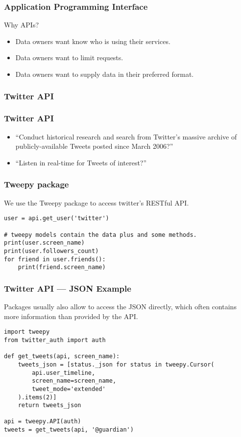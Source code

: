 
\begin{frame}
    \frametitle{Application Programming Interface}

    Why APIs?

    \begin{itemize}
        \item Data owners want know who is using their services.
        \item Data owners want to limit requests.
        \item Data owners want to supply data in their preferred format.
    \end{itemize}
\end{frame}

\subsubsection*{Twitter API}
\label{sec:twitter-api}

\begin{frame}
    \frametitle{Twitter API}
    \begin{itemize}
        \item ``Conduct historical research and search from Twitter's
        massive archive of publicly-available Tweets posted since
        March 2006?''
        \item ``Listen in real-time for Tweets of interest?''
    \end{itemize}
\end{frame}

\begin{frame}[fragile]
    \frametitle{Tweepy package}

    We use the Tweepy package to access twitter's RESTful API.

\begin{verbatim}
user = api.get_user('twitter')

# tweepy models contain the data plus and some methods.
print(user.screen_name)
print(user.followers_count)
for friend in user.friends():
    print(friend.screen_name)
\end{verbatim}

\end{frame}

\begin{frame}[fragile]
    \frametitle{Twitter API --- JSON Example}

    Packages usually also allow to access the JSON directly, which
    often contains more information than provided by the API.

    \begin{verbatim}
import tweepy
from twitter_auth import auth

def get_tweets(api, screen_name):
    tweets_json = [status._json for status in tweepy.Cursor(
        api.user_timeline,
        screen_name=screen_name,
        tweet_mode='extended'
    ).items(2)]
    return tweets_json

api = tweepy.API(auth)
tweets = get_tweets(api, '@guardian')
    \end{verbatim}
\end{frame}

